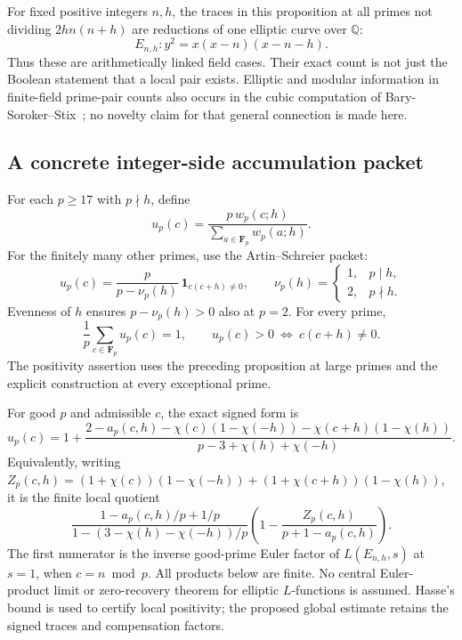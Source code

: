 \documentclass[11pt]{article}
\newcommand{\F}{\mathbf F}
\begin{document}
For fixed positive integers \(n,h\), the traces in this proposition
at all primes not dividing \(2hn(n+h)\) are reductions of one
elliptic curve over \(\mathbb Q\):
\[
                         E_{n,h}:y^2=x(x-n)(x-n-h).
\]
Thus these are arithmetically linked field cases.
Their exact count is not just the Boolean statement that a local
pair exists. Elliptic and modular information in finite-field
prime-pair counts also occurs in the cubic computation of
Bary-Soroker--Stix~\cite{BarySorokerStix}; no novelty claim for that
general connection is made here.

\subsection{A concrete integer-side accumulation packet}
For each \(p\geq17\) with \(p\nmid h\), define
\[
 u_p(c)=\frac{p\,w_p(c;h)}{\sum_{a\in\F_p}w_p(a;h)}.
\]
For the finitely many other primes, use the Artin--Schreier packet:
\[
 u_p(c)=\frac{p}{p-\nu_p(h)}\,\mathbf1_{c(c+h)\ne0},
 \qquad
 \nu_p(h)=\begin{cases}1,&p\mid h,\\2,&p\nmid h.\end{cases}
\]
Evenness of \(h\) ensures \(p-\nu_p(h)>0\) also at \(p=2\).
For every prime,
\[
 \frac1p\sum_{c\in\F_p}u_p(c)=1,\qquad
 u_p(c)>0\ \Longleftrightarrow\ c(c+h)\ne0.
\]
The positivity assertion uses the preceding proposition at large
primes and the explicit construction at every exceptional prime.

For good \(p\) and admissible \(c\), the exact signed form is
\[
 u_p(c)=1+
 \frac{2-a_p(c,h)-\chi(c)(1-\chi(-h))
                   -\chi(c+h)(1-\chi(h))}
      {p-3+\chi(h)+\chi(-h)}.
\]
Equivalently, writing
\(Z_p(c,h)=(1+\chi(c))(1-\chi(-h))
 +(1+\chi(c+h))(1-\chi(h))\), it is the finite local quotient
\[
 \frac{1-a_p(c,h)/p+1/p}{1-(3-\chi(h)-\chi(-h))/p}
        \left(1-\frac{Z_p(c,h)}{p+1-a_p(c,h)}\right).
\]
The first numerator is the inverse good-prime Euler factor of
\(L(E_{n,h},s)\) at \(s=1\), when \(c=n\bmod p\).
All products below are finite. No central Euler-product limit or
zero-recovery theorem for elliptic \(L\)-functions is assumed.
Hasse's bound is used to certify local positivity; the proposed
global estimate retains the signed traces and compensation factors.
\end{document}
